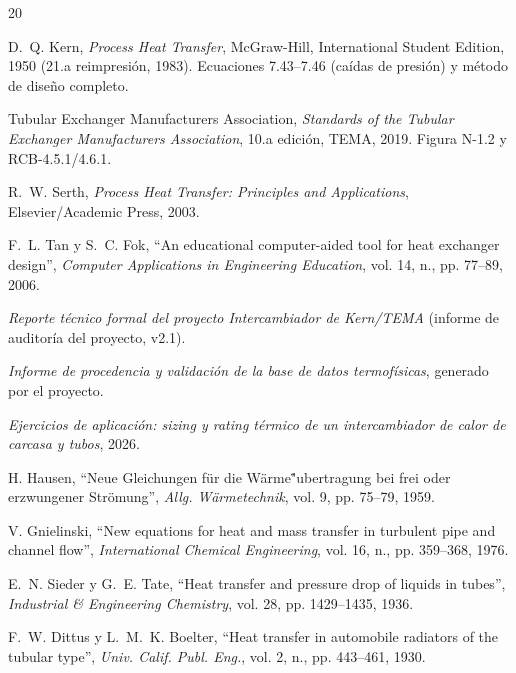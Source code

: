 \documentclass[11pt,a4paper]{article}
\begin{document}
{\renewcommand{\section}[2]{}
\begin{thebibliography}{20}

 D.~Q. Kern, \emph{Process Heat Transfer}, McGraw-Hill,
International Student Edition, 1950 (21.a reimpresi\'on, 1983). Ecuaciones
7.43--7.46 (ca\'idas de presi\'on) y m\'etodo de dise\~no completo.

 Tubular Exchanger Manufacturers Association, \emph{Standards
of the Tubular Exchanger Manufacturers Association}, 10.a edici\'on, TEMA,
2019. Figura N-1.2 y RCB-4.5.1/4.6.1.

 R.~W. Serth, \emph{Process Heat Transfer: Principles and
Applications}, Elsevier/Academic Press, 2003.

 F.~L. Tan y S.~C. Fok, ``An educational computer-aided tool
for heat exchanger design'', \emph{Computer Applications in Engineering
Education}, vol. 14, n., pp. 77--89, 2006.

 \emph{Reporte t\'ecnico formal del proyecto
Intercambiador de Kern/TEMA} (informe de auditor\'ia del proyecto, v2.1).

 \emph{Informe de procedencia y validaci\'on de la base
de datos termof\'isicas}, generado por el proyecto.

 \emph{Ejercicios de aplicaci\'on: sizing y rating
t\'ermico de un intercambiador de calor de carcasa y tubos}, 2026.

 H. Hausen, ``Neue Gleichungen f\"{u}r die W\"{a}rme\"
{"u}bertragung bei frei oder erzwungener Str\"{o}mung'', \emph{Allg.
W\"{a}rmetechnik}, vol. 9, pp. 75--79, 1959.

 V. Gnielinski, ``New equations for heat and mass
transfer in turbulent pipe and channel flow'', \emph{International Chemical
Engineering}, vol. 16, n., pp. 359--368, 1976.

 E.~N. Sieder y G.~E. Tate, ``Heat transfer and pressure drop
of liquids in tubes'', \emph{Industrial \& Engineering Chemistry},
vol. 28, pp. 1429--1435, 1936.

 F.~W. Dittus y L.~M.~K. Boelter, ``Heat transfer in
automobile radiators of the tubular type'', \emph{Univ. Calif. Publ. Eng.},
vol. 2, n., pp. 443--461, 1930.


\end{thebibliography}}
\end{document}
